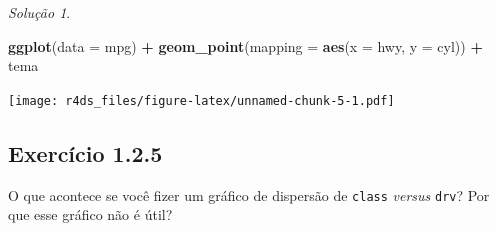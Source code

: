 \documentclass[
]{latex/krantz}
\newenvironment{Shaded}{\begin{snugshade}}{\end{snugshade}}
\newcommand{\AttributeTok}[1]{\textcolor[rgb]{0.13,0.29,0.53}{#1}}
\newcommand{\FunctionTok}[1]{\textcolor[rgb]{0.13,0.29,0.53}{\textbf{#1}}}
\newcommand{\NormalTok}[1]{#1}
\newcommand{\SpecialCharTok}[1]{\textcolor[rgb]{0.81,0.36,0.00}{\textbf{#1}}}
\theoremstyle{definition}
\theoremstyle{definition}
\theoremstyle{definition}
\theoremstyle{definition}
\theoremstyle{remark}
\newtheorem*{solution}{Solução}
\begin{document}
\begin{solution}
\leavevmode

\begin{Shaded}
\begin{Highlighting}[]
\FunctionTok{ggplot}\NormalTok{(}\AttributeTok{data =}\NormalTok{ mpg) }\SpecialCharTok{+}
    \FunctionTok{geom\_point}\NormalTok{(}\AttributeTok{mapping =} \FunctionTok{aes}\NormalTok{(}\AttributeTok{x =}\NormalTok{ hwy, }\AttributeTok{y =}\NormalTok{ cyl)) }\SpecialCharTok{+}
\NormalTok{    tema}
\end{Highlighting}
\end{Shaded}

\texttt{[image: r4ds\_files/figure-latex/unnamed-chunk-5-1.pdf]}

\end{solution}

\hypertarget{exr1-2-5}{%
\subsection*{Exercício 1.2.5}\label{exr1-2-5}}

O que acontece se você fizer um gráfico de dispersão de \texttt{class} \emph{versus} \texttt{drv}? Por que esse gráfico não é útil?
\end{document}
